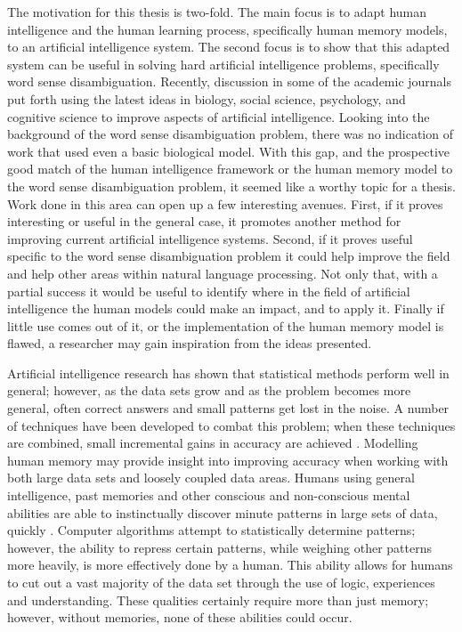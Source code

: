 The motivation for this thesis is two-fold.  The main focus is to adapt human
intelligence and the human learning process, specifically human memory models,
to an artificial intelligence system.  The second focus is to show that this
adapted system can be useful in solving hard artificial intelligence problems,
specifically word sense disambiguation.  Recently, discussion in some of the
academic journals put forth using the latest ideas in biology, social science,
psychology, and cognitive science to improve aspects of artificial intelligence.
Looking into the background of the word sense disambiguation problem, there was
no indication of work that used even a basic biological model. With this gap,
and the prospective good match of the human intelligence framework or the human
memory model to the word sense disambiguation problem, it seemed like a worthy
topic for a thesis.  Work done in this area can open up a few interesting
avenues. First, if it proves interesting or useful in the general case, it
promotes another method for improving current artificial intelligence systems.
Second, if it proves useful specific to the word sense disambiguation problem it
could help improve the field and help other areas within natural language
processing.  Not only that, with a partial success it would be useful to
identify where in the field of artificial intelligence the human models could
make an impact, and to apply it.  Finally if little use comes out of it, or the
implementation of the human memory model is flawed, a researcher may gain
inspiration from the ideas presented.

Artificial intelligence research has shown that statistical methods perform well
in general; however, as the data sets grow and as the problem becomes more general, often correct answers and small patterns get lost in the noise.  A number of techniques have been developed
to combat this problem; when these techniques are combined, small incremental
gains in accuracy are achieved \cite{ENSEMBLE2}.  Modelling human memory may
provide insight into improving accuracy when working with both large data sets
and loosely coupled data areas.  Humans using general intelligence, past
memories and other conscious and non-conscious mental abilities are able to
instinctually discover minute patterns in large sets of data, quickly
\cite{BLINK}.  Computer algorithms attempt to statistically determine patterns;
however, the ability to repress certain patterns, while weighing other patterns
more heavily, is more effectively done by a human.  This ability allows for
humans to cut out a vast majority of the data set through the use of logic,
experiences and understanding.  These qualities certainly require more than just
memory; however, without memories, none of these abilities could occur.


